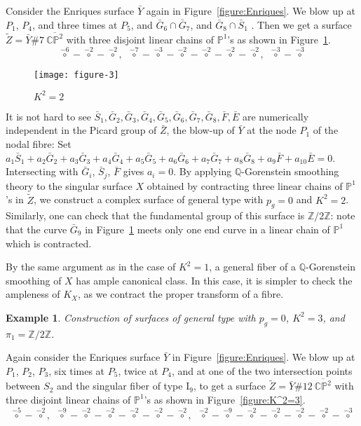 \documentclass[twoside,11pt]{amsart}
\newtheorem{example}{Example}[section]
\begin{document}
Consider the Enriques surface $\bar Y$ again in Figure~\ref{figure:Enriques}. We blow
up at $P_1$, $P_4$, and three times at $P_5$, and $\bar G_6 \cap \bar G_7$, and $\bar G_8 \cap \bar S_1$ . Then we get
a surface $\tilde Z=\bar Y\# 7\ \overline{{{\mathbb C}}{{\mathbb P}}^2}$ with three
disjoint linear chains of ${{\mathbb P}}^1$'s as shown in Figure~\ref{figure:K^2=2}.
\[ {\overset{-6}{\circ}}-{\overset{-2}{\circ}}-{\overset{-2}{\circ}}
, \, \, \,
{\overset{-7}{\circ}}-{\overset{-3}{\circ}}-{\overset{-2}{\circ}}
-{\overset{-2}{\circ}}-{\overset{-2}{\circ}}-{\overset{-2}{\circ}}, \, \, \,
{\overset{-3}{\circ}}-{\overset{-3}{\circ}}
\]

{\medskip}
\begin{figure}
\centering
\texttt{[image: figure-3]}
\caption{$K^2=2$}
\label{figure:K^2=2}
\end{figure}

{\medskip} It is not hard to see $\bar S_1, \bar G_2, \bar G_3, \bar G_4,
\bar G_5, \bar G_6, \bar G_7, \bar G_8,\bar F, \bar E$ are
numerically independent in the Picard group of $\bar Z$, the
blow-up of $\bar Y$ at the node $P_1$ of the nodal fibre: Set
$a_1\bar S_1+a_2\bar G_2+a_3\bar G_3+a_4\bar G_4+a_5\bar
G_5+a_6\bar G_6+a_7\bar G_7+a_8\bar G_8+a_9\bar F+a_{10}\bar E=0$.
Intersecting with $\bar G_i$, $\bar S_j$, $\bar F$ gives $a_i=0$.
By applying ${{\mathbb Q}}$-Gorenstein smoothing theory to the singular
surface $X$ obtained by contracting three linear chains of
${{\mathbb P}}^1$'s in $\tilde Z$, we construct a complex surface of general
type with $p_g=0$ and $K^2=2$. Similarly, one can check that the
fundamental group of this surface is ${{\mathbb Z}}/2{{\mathbb Z}}$: note that the
curve $\bar G_9$ in Figure~\ref{figure:K^2=2} meets only one end
curve in a linear chain of ${{\mathbb P}}^1$ which is contracted.

By the same argument as in the case of $K^2=1$, a general fiber of
a ${{\mathbb Q}}$-Gorenstein smoothing of $X$ has ample canonical class. In
this case, it is simpler to check the ampleness of $K_X$, as we
contract the proper transform of a fibre.

\begin{example} Construction of surfaces of general type with $p_g=0$,
$K^2=3$, and $\pi_1={{\mathbb Z}}/2{{\mathbb Z}}$. \end{example}

Again consider the Enriques surface $\bar Y$ in Figure~\ref{figure:Enriques}. We blow
up at $P_1$, $P_2$, $P_3$, six times at $P_5$, twice at $P_4$, and
at one of the two intersection points between $S_2$ and the
singular fiber of type $\mathrm{I_9}$, to get a surface $\tilde
Z=\bar Y\# 12\ \overline{{{\mathbb C}}{{\mathbb P}}^2}$ with three disjoint linear
chains of ${{\mathbb P}}^1$'s as shown in Figure~\ref{figure:K^2=3}.
\[ {\overset{-5}{\circ}}-{\overset{-2}{\circ}}, \, \, \,
{\overset{-9}{\circ}}-{\overset{-2}{\circ}}-{\overset{-2}{\circ}}
-{\overset{-2}{\circ}}-{\overset{-2}{\circ}}-{\overset{-2}{\circ}},
\, \, \,
{\overset{-2}{\circ}}-{\overset{-9}{\circ}}-{\overset{-2}{\circ}}-{\overset{-2}{\circ}}
-{\overset{-2}{\circ}}-{\overset{-2}{\circ}}-{\overset{-3}{\circ}}
\]
\end{document}
